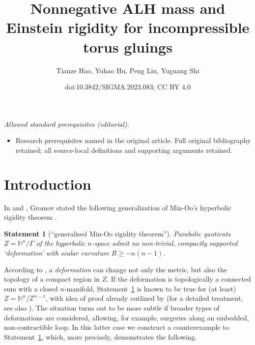 \documentclass[10pt,a4paper]{amsart}
\title{Nonnegative ALH mass and Einstein rigidity for incompressible torus gluings}
\author{Tianze Hao, Yuhao Hu, Peng Liu, Yuguang Shi}
\date{doi:10.3842/SIGMA.2023.083; CC BY 4.0}
\numberwithin{equation}{section}
\newtheorem{State}[Theorem]{Statement}
\def\H{\mathbb{H}}
\def\Z{\mathbb{Z}}
\begin{document}
\maketitle
\noindent\textit{Allowed standard prerequisites (editorial).}\begin{itemize}
\item Research prerequisites named in the original article. Full original bibliography retained; all source-local definitions and supporting arguments retained.
\end{itemize}\medskip
\section{Introduction}

In \cite[Section 3]{Gr2019} and \cite[p.~240]{Gr2021}, Gromov stated the following generalization
of Min-Oo's hyperbolic rigidity theorem \cite{MinOo89}.

\begin{State}[``generalised Min-Oo rigidity theorem'']\label{generminoo}
Parabolic quotients $Z=\mathbb{H}^n/\Gamma$ of the hyperbolic $n$-space admit no non-trivial, compactly supported `deformation' with scalar curvature $R\geq -n(n-1)$.
\end{State}
According to \cite{Gr2019}, a \emph{deformation} can change not only the metric, but also the topology of a compact region in $Z$.
If the deformation is topologically a connected sum with
a closed $n$-manifold,
Statement~\ref{generminoo} is known to be true for (at least) $Z = \H^n/\Z^{n-1}$,
with idea of proof already outlined by \cite[Section $5\frac{5}{6}$]{Gr93} (for a detailed treatment, see
also  \cite[Theorem 1.1]{ACG08}).
The situation
turns out to be more subtle
if broader types of deformations are considered, allowing, for example, surgeries along
an embedded, non-contractible loop.
In this latter case we construct a counterexample to Statement~\ref{generminoo}, which, more precisely,
demonstrates the following.
\end{document}
